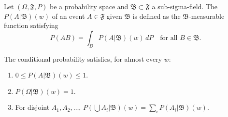 Let $(\Omega, \mathfrak{F}, P)$ be a probability space and $\mathfrak{B} \subset \mathfrak{F}$ a sub-sigma-field. The  $P(A|\mathfrak{B})(w)$ of an event $A \in \mathfrak{F}$ given $\mathfrak{B}$ is defined as the $\mathfrak{B}$-measurable function satisfying
$$P(AB) = \int_B P(A|\mathfrak{B})(w) \, dP \quad \text{for all } B \in \mathfrak{B}.$$

The conditional probability satisfies, for almost every $w$:
\begin{enumerate}
\item $0 \leq P(A|\mathfrak{B})(w) \leq 1$.
\item $P(\Omega|\mathfrak{B})(w) = 1$.
\item For disjoint $A_1, A_2, \ldots$, $P(\bigcup A_i|\mathfrak{B})(w) = \sum_i P(A_i|\mathfrak{B})(w)$.
\end{enumerate}
